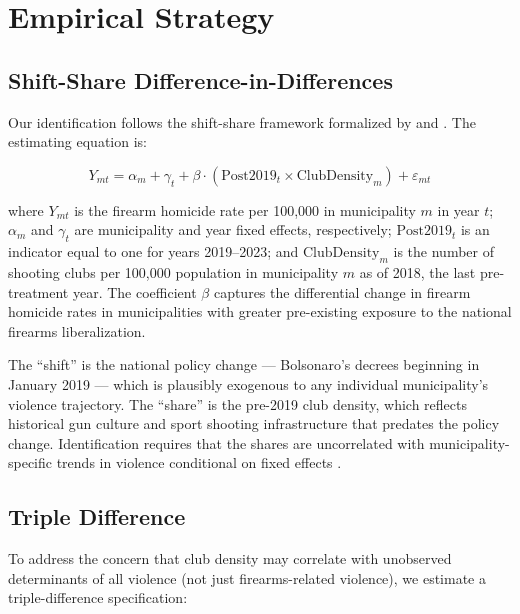 \documentclass[12pt]{article}
\begin{document}



\section{Empirical Strategy}
\label{sec:strategy}

\subsection{Shift-Share Difference-in-Differences}

Our identification follows the shift-share framework formalized by \citet{borusyak2022ssiv} and \citet{goldsmithpinkham2020}. The estimating equation is:

\begin{equation}
Y_{mt} = \alpha_m + \gamma_t + \beta \cdot (\text{Post2019}_t \times \text{ClubDensity}_m) + \varepsilon_{mt}
\label{eq:main}
\end{equation}

\noindent where $Y_{mt}$ is the firearm homicide rate per 100,000 in municipality $m$ in year $t$; $\alpha_m$ and $\gamma_t$ are municipality and year fixed effects, respectively; $\text{Post2019}_t$ is an indicator equal to one for years 2019--2023; and $\text{ClubDensity}_m$ is the number of shooting clubs per 100,000 population in municipality $m$ as of 2018, the last pre-treatment year. The coefficient $\beta$ captures the differential change in firearm homicide rates in municipalities with greater pre-existing exposure to the national firearms liberalization.

The ``shift'' is the national policy change --- Bolsonaro's decrees beginning in January 2019 --- which is plausibly exogenous to any individual municipality's violence trajectory. The ``share'' is the pre-2019 club density, which reflects historical gun culture and sport shooting infrastructure that predates the policy change. Identification requires that the shares are uncorrelated with municipality-specific trends in violence conditional on fixed effects \citep{adao2019ssdi}.

\subsection{Triple Difference}

To address the concern that club density may correlate with unobserved determinants of all violence (not just firearms-related violence), we estimate a triple-difference specification:
\end{document}
